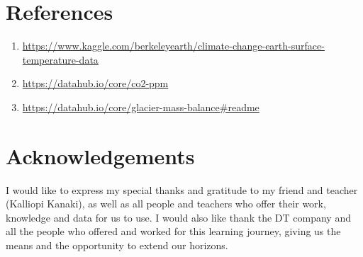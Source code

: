 \documentclass[11pt]{article}
\providecommand{\tightlist}{%
      \setlength{\itemsep}{0pt}\setlength{\parskip}{0pt}}
\begin{document}
    \hypertarget{references}{%
\section{References}\label{references}}

\begin{enumerate}
\tightlist
\item \url{https://www.kaggle.com/berkeleyearth/climate-change-earth-surface-temperature-data}
\item \url{https://datahub.io/core/co2-ppm}
\item \url{https://datahub.io/core/glacier-mass-balance\#readme}

\end{enumerate}

    \hypertarget{acknowledgements}{%
\section{Acknowledgements}\label{acknowledgements}}

I would like to express my special thanks and gratitude to my friend and
teacher (Kalliopi Kanaki), as well as all people and teachers who offer their
work, knowledge and data for us to use. I would also like thank the DT
company and all the people who offered and worked for this learning
journey, giving us the means and the opportunity to extend our horizons.
\end{document}
